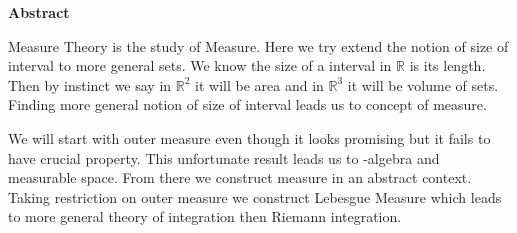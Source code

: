 \begin{center}
    \LARGE{\textbf{Abstract}}
\end{center}

Measure Theory is the study of Measure. Here we try extend the notion of size of interval to more general sets. We know the size of a interval in $\mathds{R}$ is 
its length. Then by instinct we say in $\mathds{R}^{2}$ it will be area and in $\mathds{R}^{3}$ it will be volume of sets. Finding more general notion of size of
interval leads us to concept of measure.

We will start with outer measure even though it looks promising but it fails to have crucial property. This unfortunate result leads us to \sig-algebra and measurable space. From there we construct measure in an abstract context. Taking restriction on outer measure we construct Lebesgue Measure
which leads to more general theory of integration then Riemann integration.
